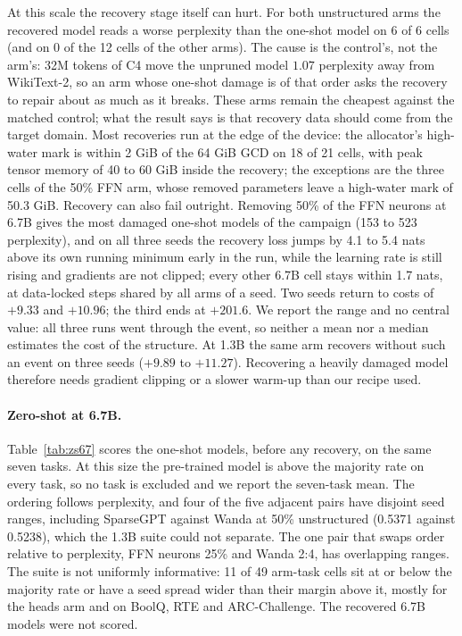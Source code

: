 \documentclass[11pt,a4paper]{article}
\begin{document}
At this scale the recovery stage itself can hurt. For both unstructured arms the recovered model reads a worse perplexity than the one-shot model on 6 of 6 cells (and on 0 of the 12 cells of the other arms). The cause is the control's, not the arm's: 32M tokens of C4 move the unpruned model $1.07$ perplexity away from WikiText-2, so an arm whose one-shot damage is of that order asks the recovery to repair about as much as it breaks. These arms remain the cheapest against the matched control; what the result says is that recovery data should come from the target domain. Most recoveries run at the edge of the device: the allocator's high-water mark is within 2 GiB of the 64 GiB GCD on 18 of 21 cells, with peak tensor memory of 40 to 60 GiB inside the recovery; the exceptions are the three cells of the 50\% FFN arm, whose removed parameters leave a high-water mark of 50.3 GiB. Recovery can also fail outright. Removing 50\% of the FFN neurons at 6.7B gives the most damaged one-shot models of the campaign (153 to 523 perplexity), and on all three seeds the recovery loss jumps by 4.1 to 5.4 nats above its own running minimum early in the run, while the learning rate is still rising and gradients are not clipped; every other 6.7B cell stays within 1.7 nats, at data-locked steps shared by all arms of a seed. Two seeds return to costs of $+9.33$ and $+10.96$; the third ends at $+201.6$. We report the range and no central value: all three runs went through the event, so neither a mean nor a median estimates the cost of the structure. At 1.3B the same arm recovers without such an event on three seeds ($+9.89$ to $+11.27$). Recovering a heavily damaged model therefore needs gradient clipping or a slower warm-up than our recipe used.

\paragraph{Zero-shot at 6.7B.} Table~\ref{tab:zs67} scores the one-shot models, before any recovery, on the same seven tasks. At this size the pre-trained model is above the majority rate on every task, so no task is excluded and we report the seven-task mean. The ordering follows perplexity, and four of the five adjacent pairs have disjoint seed ranges, including SparseGPT against Wanda at 50\% unstructured (0.5371 against 0.5238), which the 1.3B suite could not separate. The one pair that swaps order relative to perplexity, FFN neurons 25\% and Wanda 2:4, has overlapping ranges. The suite is not uniformly informative: 11 of 49 arm-task cells sit at or below the majority rate or have a seed spread wider than their margin above it, mostly for the heads arm and on BoolQ, RTE and ARC-Challenge. The recovered 6.7B models were not scored.
\end{document}
